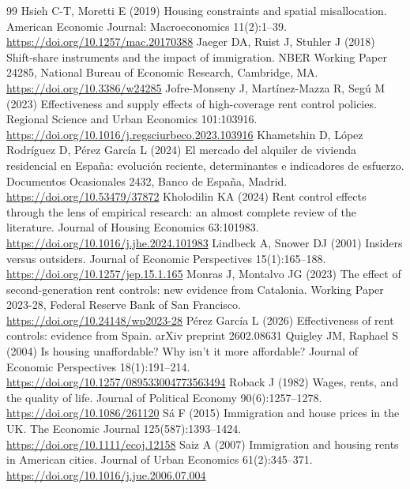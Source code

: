\begin{thebibliography}{99}
 Hsieh C-T, Moretti E (2019) Housing constraints and spatial misallocation. American Economic Journal: Macroeconomics 11(2):1--39. \url{https://doi.org/10.1257/mac.20170388}
 Jaeger DA, Ruist J, Stuhler J (2018) Shift-share instruments and the impact of immigration. NBER Working Paper 24285, National Bureau of Economic Research, Cambridge, MA. \url{https://doi.org/10.3386/w24285}
 Jofre-Monseny J, Martínez-Mazza R, Segú M (2023) Effectiveness and supply effects of high-coverage rent control policies. Regional Science and Urban Economics 101:103916. \url{https://doi.org/10.1016/j.regsciurbeco.2023.103916}
 Khametshin D, López Rodríguez D, Pérez García L (2024) El mercado del alquiler de vivienda residencial en España: evolución reciente, determinantes e indicadores de esfuerzo. Documentos Ocasionales 2432, Banco de España, Madrid. \url{https://doi.org/10.53479/37872}
 Kholodilin KA (2024) Rent control effects through the lens of empirical research: an almost complete review of the literature. Journal of Housing Economics 63:101983. \url{https://doi.org/10.1016/j.jhe.2024.101983}
 Lindbeck A, Snower DJ (2001) Insiders versus outsiders. Journal of Economic Perspectives 15(1):165--188. \url{https://doi.org/10.1257/jep.15.1.165}
 Monras J, Montalvo JG (2023) The effect of second-generation rent controls: new evidence from Catalonia. Working Paper 2023-28, Federal Reserve Bank of San Francisco. \url{https://doi.org/10.24148/wp2023-28}
 Pérez García L (2026) Effectiveness of rent controls: evidence from Spain. arXiv preprint 2602.08631
 Quigley JM, Raphael S (2004) Is housing unaffordable? Why isn't it more affordable? Journal of Economic Perspectives 18(1):191--214. \url{https://doi.org/10.1257/089533004773563494}
 Roback J (1982) Wages, rents, and the quality of life. Journal of Political Economy 90(6):1257--1278. \url{https://doi.org/10.1086/261120}
 S\'{a} F (2015) Immigration and house prices in the UK. The Economic Journal 125(587):1393--1424. \url{https://doi.org/10.1111/ecoj.12158}
 Saiz A (2007) Immigration and housing rents in American cities. Journal of Urban Economics 61(2):345--371. \url{https://doi.org/10.1016/j.jue.2006.07.004}

\end{thebibliography}
